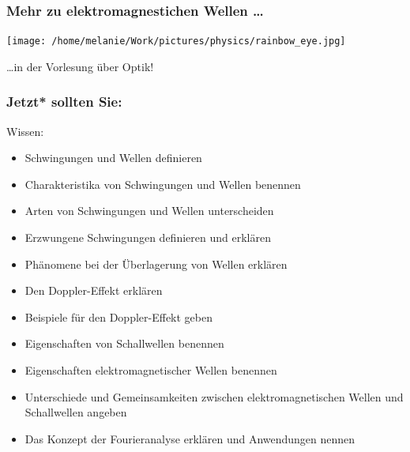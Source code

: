 \documentclass{beamer}
\begin{document}


\begin{frame}
\frametitle{Mehr zu elektromagnestichen Wellen \dots}


\begin{center}
\texttt{[image: /home/melanie/Work/pictures/physics/rainbow\_eye.jpg]}
\end{center}

\dots in der Vorlesung über Optik!


\end{frame}





\begin{frame}

\frametitle{Jetzt* sollten Sie:}

\begin{block}{Wissen:}
\begin{itemize}
\item
Schwingungen und Wellen definieren
\item
Charakteristika von Schwingungen und Wellen benennen 
\item
Arten von Schwingungen und Wellen unterscheiden
\item
Erzwungene Schwingungen definieren und erklären
\item
Phänomene bei der Überlagerung von Wellen erklären
\item
Den Doppler-Effekt erklären
\item
Beispiele für den Doppler-Effekt geben
\item
Eigenschaften von Schallwellen benennen
\item
Eigenschaften elektromagnetischer Wellen benennen
\item
Unterschiede und Gemeinsamkeiten zwischen elektromagnetischen Wellen und Schallwellen angeben
\item
Das Konzept der Fourieranalyse erklären und Anwendungen nennen
\end{itemize} 

\end{block}

\end{frame}
\end{document}
